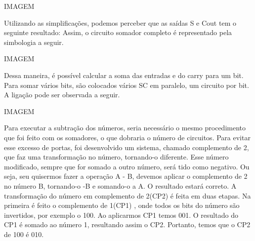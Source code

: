 \documentclass[12pts]{article}
\begin{document}
IMAGEM


Utilizando as simplificações, podemos perceber que as saídas S e Cout tem o seguinte resultado:
Assim, o circuito somador completo é representado pela simbologia a seguir.

IMAGEM

Dessa maneira, é possível calcular a soma das entradas e do carry para um bit.
Para somar vários bits, são colocados vários SC em paralelo, um circuito por bit. A ligação pode ser observada a seguir.

IMAGEM

Para executar a subtração dos números, seria necessário o mesmo procedimento que foi feito com os somadores, o que dobraria o número de circuitos. Para evitar esse excesso de portas, foi desenvolvido um sistema, chamado complemento de 2, que faz uma transformação no número, tornando-o diferente. Esse número modificado, sempre que for somado a outro número, será tido como negativo. Ou seja, seu quisermos fazer a operação A - B, devemos aplicar o complemento de 2 no número B, tornando-o -B e somando-o a A. O resultado estará correto.
A transformação do número em complemento de 2(CP2) é feita em duas etapas. Na primeira é feito o complemento de 1(CP1) , onde todos os bits do número são invertidos, por exemplo o 100. Ao aplicarmos CP1 temos 001. O resultado do CP1 é somado ao número 1, resultando assim o CP2. Portanto, temos que o CP2 de 100 é 010.

\newpage
\end{document}
